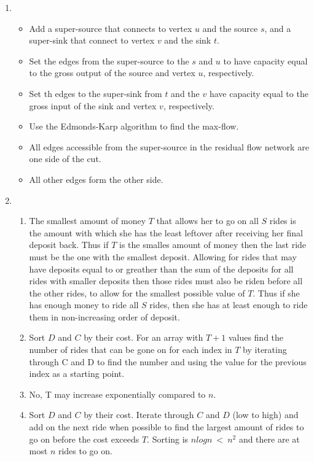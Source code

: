 \documentclass[a4paper]{article}
\begin{document}
\begin{enumerate}
\begin{enumerate}
				\end{enumerate}
		\item 
				\begin{itemize}
						\item Add a super-source that connects to vertex $u$ and the source $s$, and a super-sink that connect to vertex $v$ and the sink $t$.
						\item Set the edges from the super-source to the $s$ and $u$ to have capacity equal to the gross output of the source and vertex $u$, respectively.
						\item Set th edges to the super-sink from $t$ and the $v$ have capacity equal to the gross input of the sink and vertex $v$, respectively.
						\item Use the Edmonds-Karp algorithm to find the max-flow.
						\item All edges accessible from the super-source in the residual flow network are one side of the cut.
						\item All other edges form the other side.
				\end{itemize}
		\item
				\begin{enumerate}
						\item The smallest amount of money $T$ that allows her to go on all $S$ rides is the amount with which she has the least leftover after receiving her final deposit back. Thus if $T$ is the smalles amount of money then the last ride must be the one with the smallest deposit. Allowing for rides that may have deposits equal to or greather than the sum of the deposits for all rides with smaller deposits then those rides must also be riden before all the other rides, to allow for the smallest possible value of $T$. Thus if she has enough money to ride all $S$ rides, then she has at least enough to ride them in non-increasing order of deposit.
						\item Sort $D$ and $C$ by their cost. For an array with $T+1$ values find the number of rides that can be gone on for each index in $T$ by iterating through C and D to find the number and using the value for the previous index as a starting point.
						\item No, T may increase exponentially compared to $n$.
						\item Sort $D$ and $C$ by their cost. Iterate through $C$ and $D$ (low to high) and add on the next ride when possible to find the largest amount of rides to go on  before the cost exceeds $T$. Sorting is $nlogn\ <\ n^2$ and there are at most $n$ rides to go on.

				\end{enumerate}
\end{enumerate}
\end{document}
